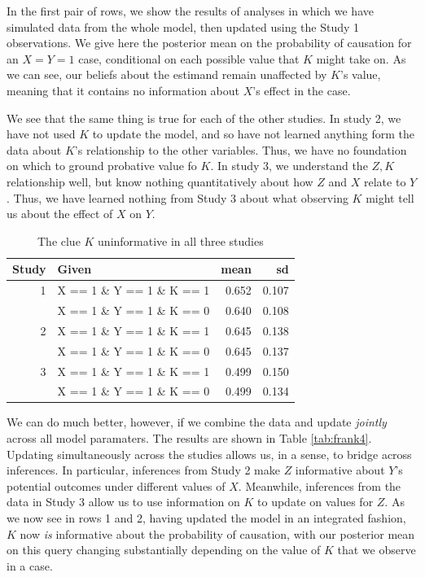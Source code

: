 \documentclass[
  12pt,
]{book}
\begin{document}
In the first pair of rows, we show the results of analyses in which we have simulated data from the whole model, then updated using the Study 1 observations. We give here the posterior mean on the probability of causation for an \(X=Y=1\) case, conditional on each possible value that \(K\) might take on. As we can see, our beliefs about the estimand remain unaffected by \(K\)'s value, meaning that it contains no information about \(X\)'s effect in the case.

We see that the same thing is true for each of the other studies. In study 2, we have not used \(K\) to update the model, and so have not learned anything form the data about \(K\)'s relationship to the other variables. Thus, we have no foundation on which to ground probative value fo \(K\). In study 3, we understand the \(Z,K\) relationship well, but know nothing quantitatively about how \(Z\) and \(X\) relate to \(Y\). Thus, we have learned nothing from Study 3 about what observing \(K\) might tell us about the effect of \(X\) on \(Y\).

\begin{table}

\caption{\label{tab:frank1}The clue $K$ uninformative in all three studies}
\centering
\begin{tabular}[t]{r|l|r|r}
\hline
Study & Given & mean & sd\\
\hline
1 & X == 1 \& Y == 1 \& K == 1 & 0.652 & 0.107\\
\hline
 & X == 1 \& Y == 1 \& K == 0 & 0.640 & 0.108\\
\hline
2 & X == 1 \& Y == 1 \& K == 1 & 0.645 & 0.138\\
\hline
 & X == 1 \& Y == 1 \& K == 0 & 0.645 & 0.137\\
\hline
3 & X == 1 \& Y == 1 \& K == 1 & 0.499 & 0.150\\
\hline
 & X == 1 \& Y == 1 \& K == 0 & 0.499 & 0.134\\
\hline
\end{tabular}
\end{table}

We can do much better, however, if we combine the data and update \emph{jointly} across all model paramaters. The results are shown in Table \ref{tab:frank4}. Updating simultaneously across the studies allows us, in a sense, to bridge across inferences. In particular, inferences from Study 2 make \(Z\) informative about \(Y\)'s potential outcomes under different values of \(X\). Meanwhile, inferences from the data in Study 3 allow us to use information on \(K\) to update on values for \(Z\). As we now see in rows 1 and 2, having updated the model in an integrated fashion, \(K\) now \emph{is} informative about the probability of causation, with our posterior mean on this query changing substantially depending on the value of \(K\) that we observe in a case.
\end{document}
